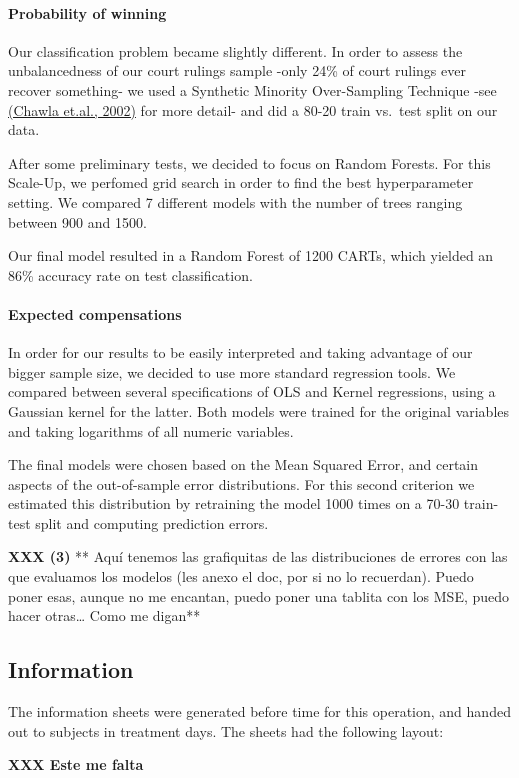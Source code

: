 \documentclass[]{article}
\let\oldparagraph\paragraph
\renewcommand{\paragraph}[1]{\oldparagraph{#1}\mbox{}}
\begin{document}
\paragraph{Probability of winning}\label{probability-of-winning}

Our classification problem became slightly different. In order to assess
the unbalancedness of our court rulings sample -only 24\% of court
rulings ever recover something- we used a Synthetic Minority
Over-Sampling Technique -see
\href{http://jair.org/media/953/live-953-2037-jair.pdf}{(Chawla et.al.,
2002)} for more detail- and did a 80-20 train vs.~test split on our
data.

After some preliminary tests, we decided to focus on Random Forests. For
this Scale-Up, we perfomed grid search in order to find the best
hyperparameter setting. We compared 7 different models with the number
of trees ranging between 900 and 1500.

Our final model resulted in a Random Forest of 1200 CARTs, which yielded
an 86\% accuracy rate on test classification.

\paragraph{Expected compensations}\label{expected-compensations}

In order for our results to be easily interpreted and taking advantage
of our bigger sample size, we decided to use more standard regression
tools. We compared between several specifications of OLS and Kernel
regressions, using a Gaussian kernel for the latter. Both models were
trained for the original variables and taking logarithms of all numeric
variables.

The final models were chosen based on the Mean Squared Error, and
certain aspects of the out-of-sample error distributions. For this
second criterion we estimated this distribution by retraining the model
1000 times on a 70-30 train-test split and computing prediction errors.

\textbf{XXX (3)} ** Aquí tenemos las grafiquitas de las distribuciones
de errores con las que evaluamos los modelos (les anexo el doc, por si
no lo recuerdan). Puedo poner esas, aunque no me encantan, puedo poner
una tablita con los MSE, puedo hacer otras\ldots{} Como me digan**

\subsection{Information}\label{information-1}

The information sheets were generated before time for this operation,
and handed out to subjects in treatment days. The sheets had the
following layout:

\textbf{XXX Este me falta}
\end{document}
